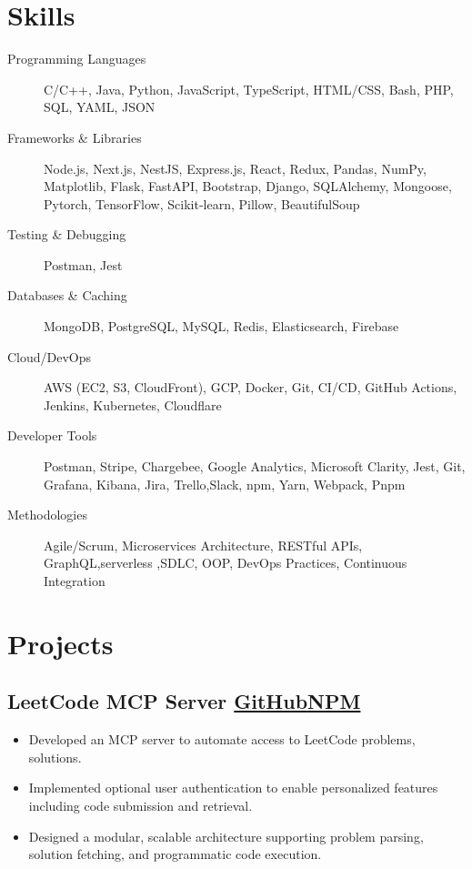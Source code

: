 \documentclass[10pt]{article}
\newcommand{\rside}[1]{
  \hfill {\small\color{accent} #1}%
}
\begin{document}
\section{Skills}
\begin{description}
  \item[Programming Languages] C/C++, Java, Python, JavaScript, TypeScript, HTML/CSS, Bash, PHP, SQL, YAML, JSON
  \item[Frameworks \& Libraries] Node.js, Next.js, NestJS, Express.js, React, Redux, Pandas, NumPy, Matplotlib, Flask, FastAPI, Bootstrap, Django, SQLAlchemy, Mongoose, Pytorch, TensorFlow, Scikit-learn, Pillow, BeautifulSoup 
  \item[Testing \& Debugging] Postman, Jest
  \item[Databases \& Caching] MongoDB, PostgreSQL, MySQL, Redis, Elasticsearch, Firebase
  \item[Cloud/DevOps] AWS (EC2, S3, CloudFront), GCP, Docker, Git, CI/CD, GitHub Actions, Jenkins, Kubernetes, Cloudflare
  \item[Developer Tools] Postman, Stripe, Chargebee, Google Analytics, Microsoft Clarity, Jest, Git, Grafana, Kibana, Jira, Trello,Slack, npm, Yarn, Webpack, Pnpm
  \item[Methodologies] Agile/Scrum, Microservices Architecture, RESTful APIs, GraphQL,serverless ,SDLC, OOP, DevOps Practices, Continuous Integration
\end{description}

\section{Projects}
\subsection{LeetCode MCP Server \rside{\href{https://github.com/ayushjaipuriyar/leetcode-mcpserver}{GitHub}\hspace{0.1cm}\href{https://www.npmjs.com/package/leetcode-mcpserver}{NPM}}}
\begin{itemize}
  \item Developed an MCP server to  automate access to LeetCode problems, solutions.
  \item Implemented optional user authentication to enable personalized features including code submission and retrieval.
  \item Designed a modular, scalable architecture supporting problem parsing, solution fetching, and programmatic code execution.
\end{itemize}
\end{document}
